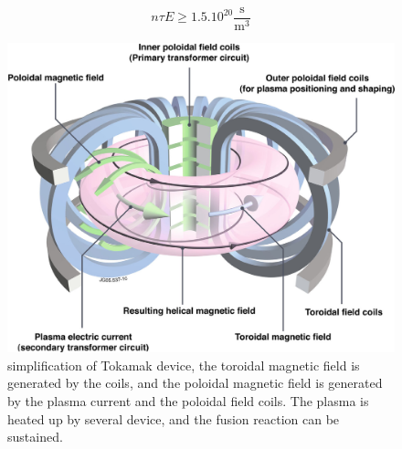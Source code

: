 \documentclass[11pt,a4paper,openany]{report}
\begin{document}
\begin{multicols}{2}
    $$n \tau E \ge 1.5.10^{20}{\frac {\mathrm {s} }{\mathrm {m} ^{3}}}$$
    \begin{figure}[H]
        \centering
        \includegraphics[width=1\linewidth]{./figures/tokamak.png}
        \caption{simplification of Tokamak device, the toroidal magnetic field is generated by the coils, and the poloidal magnetic field is generated by the plasma current and the poloidal field coils. The plasma is heated up by several device, and the fusion reaction can be sustained.}
        \label{}
    \end{figure}


\end{multicols}
\end{document}

